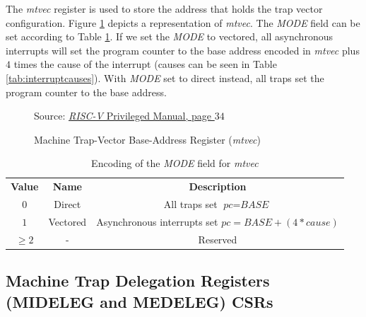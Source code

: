 The \textit{mtvec} register is used to store the address that holds the trap
vector configuration. Figure \ref{fig:mtvec} depicts a representation of \textit{mtvec}.
The \textit{MODE} field can be set according to Table \ref{tab:mode}. If we set the
\textit{MODE} to vectored, all asynchronous interrupts will set the program counter
to the base address encoded in \textit{mtvec} plus $4$ times the cause of the
interrupt (causes can be seen in Table \ref{tab:interruptcauses}). With \textit{MODE}
set to direct instead, all traps set the program counter to the base address. \\
\begin{figure}[H]
  \centering
  \def\stackalignment{r} %
  {\scriptsize Source: \href{https://drive.google.com/file/d/17GeetSnT5wW3xNuAHI95-SI1gPGd5sJ_/view}{\textit{RISC-V} Privileged Manual, page $34$}}
  \caption{Machine Trap-Vector Base-Address Register (\textit{mtvec})}
  \label{fig:mtvec}
\end{figure}

\begin{table}
  \centering
  \begin{tabular}{|c|c|c|}
    \hline
    \textbf{Value}   & \textbf{Name} & \textbf{Description}                                                        \\
    \hhline{===} $0$ & Direct        & All traps set $\textit{pc}= \textit{BASE}$                                  \\
    \hline
    $1$              & Vectored      & Asynchronous interrupts set $\textit{pc}= \textit{BASE}+(4*\textit{cause})$ \\
    \hline
    $\geq 2$         & -             & Reserved                                                                    \\
    \hline
  \end{tabular}
  \caption{Encoding of the \textit{MODE} field for \textit{mtvec}}
  \label{tab:mode}
\end{table}

\subsection{Machine Trap Delegation Registers (MIDELEG and MEDELEG) CSRs}
\label{subsec:riscv_deleg}

